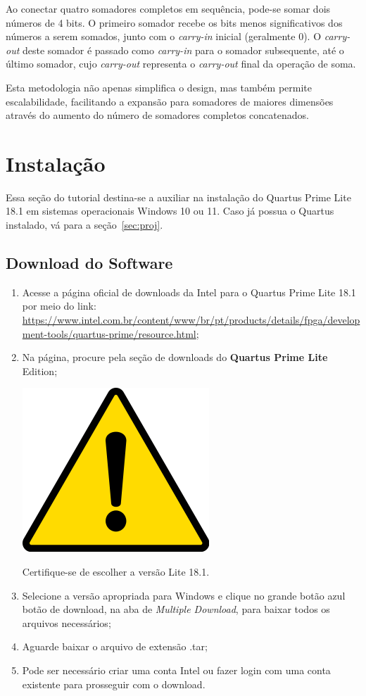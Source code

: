 \documentclass[12pt,a4paper]{article}
\newcommand{\DonwloadUrl}{\url{https://www.intel.com.br/content/www/br/pt/products/details/fpga/development-tools/quartus-prime/resource.html}}
\newcommand{\Version}{18.1}
\newcommand{\Attention}[1]{
    \begin{tcolorbox}[colback=red!5!white, colframe=red!75!black]
        \noindent
        \begin{minipage}[c]{1cm}%
            \includegraphics[width=\linewidth]{figs/attention.png}
        \end{minipage}%
        \hfill%
        \begin{minipage}[c]{\dimexpr\linewidth-1cm-2mm}%
            \begin{center}
                #1    
            \end{center}            
        \end{minipage}
    \end{tcolorbox}
}
\begin{document}
Ao conectar quatro somadores completos em sequência, pode-se somar dois números de 4 bits. O primeiro somador recebe os bits menos significativos dos números a serem somados, junto com o \textit{carry-in} inicial (geralmente 0). O \textit{carry-out} deste somador é passado como \textit{carry-in} para o somador subsequente, até o último somador, cujo \textit{carry-out} representa o \textit{carry-out} final da operação de soma.

Esta metodologia não apenas simplifica o design, mas também permite escalabilidade, facilitando a expansão para somadores de maiores dimensões através do aumento do número de somadores completos concatenados. %

\section{Instalação}

Essa seção do tutorial destina-se a auxiliar na instalação do Quartus Prime Lite \Version{} em sistemas operacionais Windows 10 ou 11. Caso já possua o Quartus instalado, vá para a seção~\ref{sec:proj}.

\subsection{Download do Software}

\begin{enumerate}
    \item Acesse a página oficial de downloads da Intel para o Quartus Prime Lite \Version{} por meio do link: \DonwloadUrl;
    \item Na página, procure pela seção de downloads do \textbf{Quartus Prime Lite} Edition;
    
    \Attention{Certifique-se de escolher a versão Lite \Version.}

    \item Selecione a versão apropriada para Windows e clique no grande botão azul botão de download, na aba de \textit{Multiple Download}, para baixar todos os arquivos necessários;
    \item Aguarde baixar o arquivo de extensão .tar;
    \item Pode ser necessário criar uma conta Intel ou fazer login com uma conta existente para prosseguir com o download.
\end{enumerate}
\end{document}
